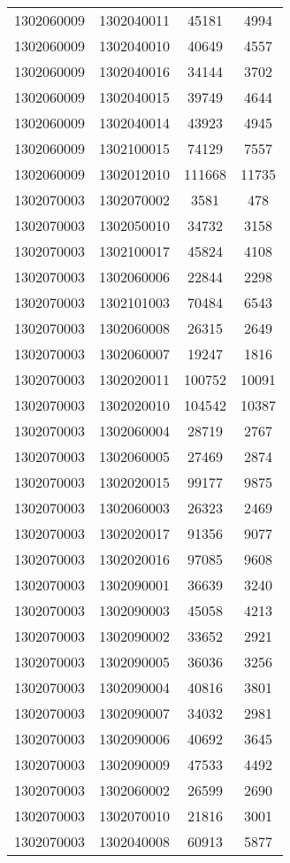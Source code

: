 \begin{longtable}{llcc}
1302060009 & 1302040011 & 45181 & 4994\\
1302060009 & 1302040010 & 40649 & 4557\\
1302060009 & 1302040016 & 34144 & 3702\\
1302060009 & 1302040015 & 39749 & 4644\\
1302060009 & 1302040014 & 43923 & 4945\\
1302060009 & 1302100015 & 74129 & 7557\\
1302060009 & 1302012010 & 111668 & 11735\\
1302070003 & 1302070002 & 3581 & 478\\
1302070003 & 1302050010 & 34732 & 3158\\
1302070003 & 1302100017 & 45824 & 4108\\
1302070003 & 1302060006 & 22844 & 2298\\
1302070003 & 1302101003 & 70484 & 6543\\
1302070003 & 1302060008 & 26315 & 2649\\
1302070003 & 1302060007 & 19247 & 1816\\
1302070003 & 1302020011 & 100752 & 10091\\
1302070003 & 1302020010 & 104542 & 10387\\
1302070003 & 1302060004 & 28719 & 2767\\
1302070003 & 1302060005 & 27469 & 2874\\
1302070003 & 1302020015 & 99177 & 9875\\
1302070003 & 1302060003 & 26323 & 2469\\
1302070003 & 1302020017 & 91356 & 9077\\
1302070003 & 1302020016 & 97085 & 9608\\
1302070003 & 1302090001 & 36639 & 3240\\
1302070003 & 1302090003 & 45058 & 4213\\
1302070003 & 1302090002 & 33652 & 2921\\
1302070003 & 1302090005 & 36036 & 3256\\
1302070003 & 1302090004 & 40816 & 3801\\
1302070003 & 1302090007 & 34032 & 2981\\
1302070003 & 1302090006 & 40692 & 3645\\
1302070003 & 1302090009 & 47533 & 4492\\
1302070003 & 1302060002 & 26599 & 2690\\
1302070003 & 1302070010 & 21816 & 3001\\
1302070003 & 1302040008 & 60913 & 5877\\

\end{longtable}
